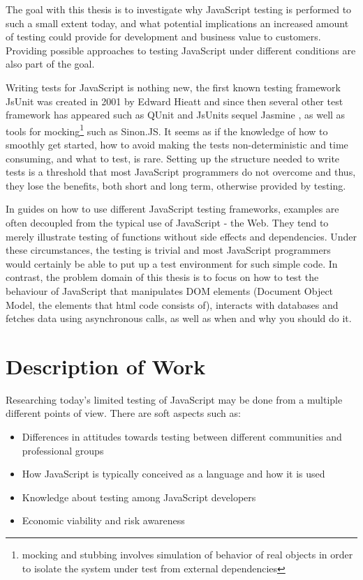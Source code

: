 \documentclass[11pt]{article}
\begin{document}
The goal with this thesis is to investigate why JavaScript testing is performed to such a small extent today, and what potential implications an increased amount of testing could provide for development and business value to customers. Providing possible approaches to testing JavaScript under different conditions are also part of the goal.

Writing tests for JavaScript is nothing new, the first known testing framework JsUnit was created in 2001 by Edward Hieatt\cite{GoingFaster,JsUnitGithub} and since then several other test framework has appeared such as QUnit \cite{QUnitSite} and JsUnits sequel Jasmine \cite{JasmineSite}, as well as tools for mocking\footnote{mocking and stubbing involves simulation of behavior of real objects in order to isolate the system under test from external dependencies} such as Sinon.JS\cite{SinonJS}. It seems as if the knowledge of how to smoothly get started, how to avoid making the tests non-deterministic and time consuming, and what to test, is rare. Setting up the structure needed to write tests is a threshold that most JavaScript programmers do not overcome\cite{TestingStatistics} and thus, they lose the benefits, both short and long term, otherwise provided by testing.

In guides on how to use different JavaScript testing frameworks, examples are often decoupled from the typical use of JavaScript - the Web. They tend to merely illustrate testing of functions without side effects and dependencies. Under these circumstances, the testing is trivial and most JavaScript programmers would certainly be able to put up a test environment for such simple code. In contrast, the problem domain of this thesis is to focus on how to test the behaviour of JavaScript that manipulates DOM elements (Document Object Model, the elements that html code consists of), interacts with databases and fetches data using asynchronous calls, as well as when and why you should do it.

\section{Description of Work}

Researching today's limited testing of JavaScript may be done from a multiple different points of view. There are soft aspects such as:
\begin{itemize}
\item Differences in attitudes towards testing between different communities and professional groups
\item How JavaScript is typically conceived as a language and how it is used
\item Knowledge about testing among JavaScript developers
\item Economic viability and risk awareness
\end{itemize}
\end{document}
